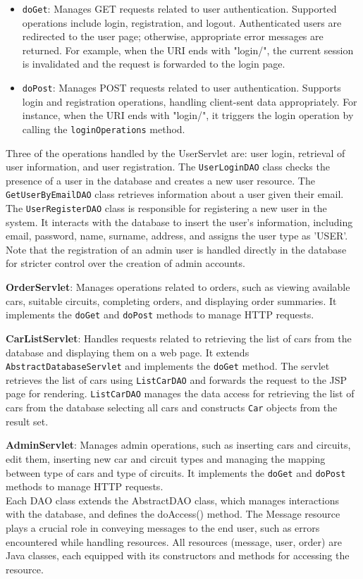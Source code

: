 \begin{itemize}
    \item \texttt{doGet}: Manages GET requests related to user authentication. Supported operations include login, registration, and logout. Authenticated users are redirected to the user page; otherwise, appropriate error messages are returned. For example, when the URI ends with "login/", the current session is invalidated and the request is forwarded to the login page.
    \item \texttt{doPost}: Manages POST requests related to user authentication. Supports login and registration operations, handling client-sent data appropriately. For instance, when the URI ends with "login/", it triggers the login operation by calling the \texttt{loginOperations} method.
\end{itemize}

Three of the operations handled by the UserServlet are: user login, retrieval of user information, and user registration. The \texttt{UserLoginDAO} class checks the presence of a user in the database and creates a new user resource. The \texttt{GetUserByEmailDAO} class retrieves information about a user given their email. The \texttt{UserRegisterDAO} class is responsible for registering a new user in the system. It interacts with the database to insert the user's information, including email, password, name, surname, address, and assigns the user type as 'USER'. Note that the registration of an admin user is handled directly in the database for stricter control over the creation of admin accounts.

\textbf{OrderServlet}: Manages operations related to orders, such as viewing available cars, suitable circuits, completing orders, and displaying order summaries. It implements the \texttt{doGet} and \texttt{doPost} methods to manage HTTP requests.

\textbf{CarListServlet}: Handles requests related to retrieving the list of cars from the database and displaying them on a web page. It extends \texttt{AbstractDatabaseServlet} and implements the \texttt{doGet} method. The servlet retrieves the list of cars using \texttt{ListCarDAO} and forwards the request to the JSP page for rendering. \texttt{ListCarDAO} manages the data access for retrieving the list of cars from the database selecting all cars and constructs \texttt{Car} objects from the result set.

\textbf{AdminServlet}: Manages admin operations, such as inserting cars and circuits, edit them, inserting new car and circuit types and managing the mapping between type of cars and type of circuits. It implements the \texttt{doGet} and \texttt{doPost} methods to manage HTTP requests.\\

Each DAO class extends the AbstractDAO class, which manages interactions with the database, and defines the doAccess() method. The Message resource plays a crucial role in conveying messages to the end user, such as errors encountered while handling resources. All resources (message, user, order) are Java classes, each equipped with its constructors and methods for accessing the resource.